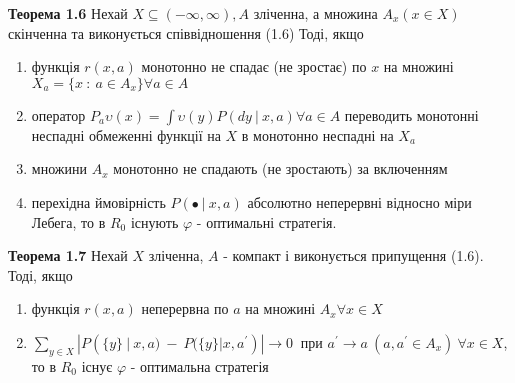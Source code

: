 \documentclass[a4paper, 14pt]{extarticle}
\begin{document}
 \textbf{Теорема 1.6}\newline
 Нехай $X \subseteq (- \infty, \infty), A $    зліченна, а множина $A_x (x \in X)$ скінченна та виконується співвідношення (1.6)\newline
Тоді, якщо\newline
\begin{enumerate}
\item функція $r(x,a)$ монотонно не спадає (не зростає) по $x$ на множині $X_a = \lbrace x \ : \ a\in A_x \rbrace \forall a \in A$
\item оператор $P_a \upsilon(x) = \int \upsilon(y)P(dy \ | \ x,a) \forall a \in A$ переводить монотонні неспадні обмеженні функції на $X$ в монотонно неспадні на $X_a$
\item множини $A_x$ монотонно не спадають (не зростають) за включенням
\item перехідна ймовірність $P(\bullet \ | \ x,a)$ абсолютно неперервні відносно міри Лебега, то в $R_0$ існують $\varphi$ - оптимальні стратегія. 
\end{enumerate}


 \textbf{Теорема 1.7}\newline
 Нехай $X$ зліченна, $A$ - компакт і виконується припущення (1.6). Тоді, якщо
 \begin{enumerate}
 \item функція $r(x,a)$ неперервна по $a$ на множині $A_x \forall x \in X$ 
 \item $ \sum_{y \in X} |P( \lbrace y \rbrace \ | \ x,a) \ - \ P(\lbrace y \rbrace | x,a^{'})| \rightarrow 0 \ $ при $a^{'}\rightarrow a \ (a,a^{'} \in A_x) \ \forall x \in X$, то в $R_0$ існує $\varphi$ - оптимальна стратегія
 \end{enumerate}
 \newpage
 
\end{document}
